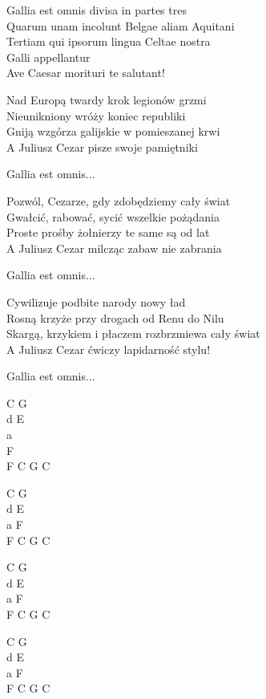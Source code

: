 \begin{text}
    \vin Gallia est omnis divisa in partes tres\\
    \vin Quarum unam incolunt Belgae aliam Aquitani\\
    \vin Tertiam qui ipsorum lingua Celtae nostra\\
    \vin Galli appellantur\\
    \vin Ave Caesar morituri te salutant!

    Nad Europą twardy krok legionów grzmi\\
    Nieunikniony wróży koniec republiki\\
    Gniją wzgórza galijskie w pomieszanej krwi\\
    A Juliusz Cezar pisze swoje pamiętniki

    \vin Gallia est omnis...

    Pozwól, Cezarze, gdy zdobędziemy cały świat\\
    Gwałcić, rabować, sycić wszelkie pożądania\\
    Proste prośby żołnierzy te same są od lat\\
    A Juliusz Cezar milcząc zabaw nie zabrania

    \vin Gallia est omnis...

    Cywilizuje podbite narody nowy ład\\
    Rosną krzyże przy drogach od Renu do Nilu\\
    Skargą, krzykiem i płaczem rozbrzmiewa cały świat\\
    A Juliusz Cezar ćwiczy lapidarność stylu!

    \vin Gallia est omnis...
\end{text}
\begin{chord}
    C G\\
    d E\\
    a\\
    F\\
    F C G C

    C G\\
    d E\\
    a F\\
    F C G C\\
    \hfill\break

    C G\\
    d E\\
    a F\\
    F C G C\\
    \hfill\break

    C G\\
    d E\\
    a F\\
    F C G C
\end{chord}
